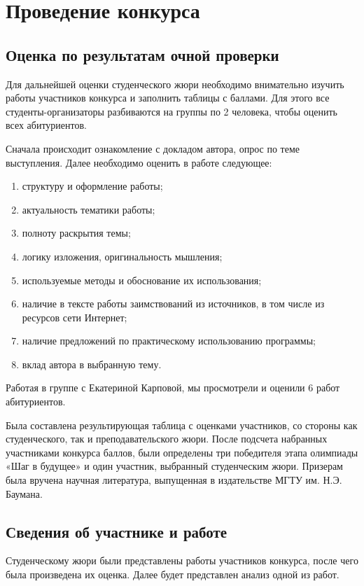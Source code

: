 \chapter{Проведение конкурса}

\section{Оценка по результатам очной проверки}
Для дальнейшей оценки студенческого жюри необходимо внимательно изучить работы участников конкурса и заполнить таблицы с баллами. Для этого все студенты-организаторы разбиваются на группы по 2 человека, чтобы оценить всех абитуриентов.

Сначала происходит ознакомление с докладом автора, опрос по теме выступления. Далее необходимо оценить в работе следующее:

\begin{enumerate}
	\item структуру и оформление работы;
	\item актуальность тематики работы;
	\item полноту раскрытия темы;
	\item логику изложения, оригинальность мышления;
	\item используемые методы и обоснование их использования;
	\item наличие в тексте работы заимствований из источников, в том числе из ресурсов сети Интернет;
	\item наличие предложений по практическому использованию программы;
	\item вклад автора в выбранную тему.
\end{enumerate}

Работая в группе с Екатериной Карповой, мы просмотрели и оценили 6 работ абитуриентов.

Была составлена результирующая таблица с оценками участников, со стороны как студенческого, так и преподавательского жюри. После подсчета набранных участниками конкурса баллов, были определены три победителя этапа олимпиады «Шаг в будущее» и один участник, выбранный студенческим жюри. Призерам была вручена научная литература, выпущенная в издательстве МГТУ им. Н.Э. Баумана.


\section{Сведения об участнике и работе}

Студенческому жюри были представлены работы участников конкурса, после чего была произведена их оценка. Далее будет представлен анализ одной из работ.

